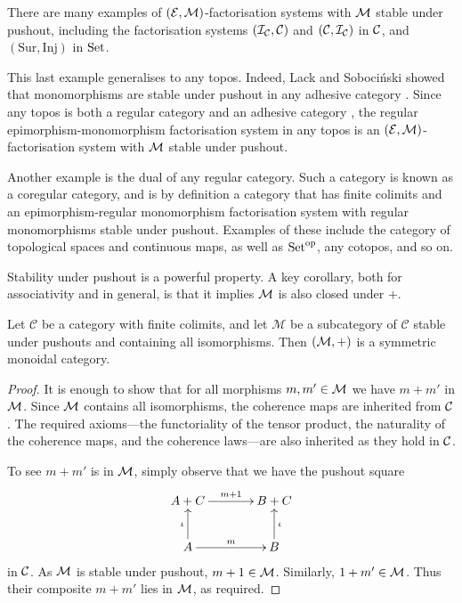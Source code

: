 \begin{examples}
  There are many examples of $(\mathcal E,\mathcal M)$-factorisation systems with $\mathcal M$
  stable under pushout, including the factorisation systems $(\mathcal I_{\mathcal C},\mathcal
  C)$ and $(\mathcal C,\mathcal I_{\mathcal C})$ in $\mathcal C$, and $(\mathrm{Sur},\mathrm{Inj})$
  in $\mathrm{Set}$.

  This last example generalises to any topos. Indeed, Lack and Soboci\'nski
  showed that monomorphisms are stable under pushout in any adhesive category
  \cite{LS04}.  Since any topos is both a regular category and an adhesive
  category \cite{LS06,Lac11}, the regular epimorphism-monomorphism factorisation
  system in any topos is an $(\mathcal E,\mathcal M)$-factorisation system with $\mathcal M$
  stable under pushout.
  
  Another example is the dual of any regular category. Such a category is known
  as a coregular category, and is by definition a category that has finite
  colimits and an epimorphism-regular monomorphism factorisation system with
  regular monomorphisms stable under pushout. Examples of these include the
  category of topological spaces and continuous maps, as well as $\mathrm{Set}^{\mathrm{op}}$,
  any cotopos, and so on.
\end{examples}

Stability under pushout is a powerful property. A key corollary, both for
associativity and in general, is that it implies $\mathcal M$ is also closed under
$+$. 

\begin{lemma} \label{lem.mcoproductsmc}
  Let $\mathcal C$ be a category with finite colimits, and let $\mathcal M$ be a
  subcategory of $\mathcal C$ stable under pushouts and containing all
  isomorphisms. Then $(\mathcal M,+)$ is a symmetric monoidal category.
\end{lemma}
\begin{proof}
  It is enough to show that for all morphisms $m,m' \in \mathcal M$ we have $m+m'$ in
  $\mathcal M$. Since $\mathcal M$ contains all isomorphisms, the coherence maps are
  inherited from $\mathcal C$. The required axioms---the functoriality of the tensor
  product, the naturality of the coherence maps, and the coherence laws---are
  also inherited as they hold in $\mathcal C$.

  To see $m+m'$ is in $\mathcal M$, simply observe that we have the pushout square
  \[
  \xymatrixcolsep{3pc}
  \xymatrixrowsep{2pc}
    \xymatrix{
      A+C \ar[r]^{m+1} & B+C \\
      A \ar[r]^m \ar[u]^{\iota} & B \ar[u]_{\iota} \\
    }
  \]
  in $\mathcal C$. As $\mathcal M$ is stable under pushout, $m+1 \in \mathcal M$. Similarly,
  $1+m' \in \mathcal M$. Thus their composite $m+m'$ lies in $\mathcal M$, as required.
\end{proof}


